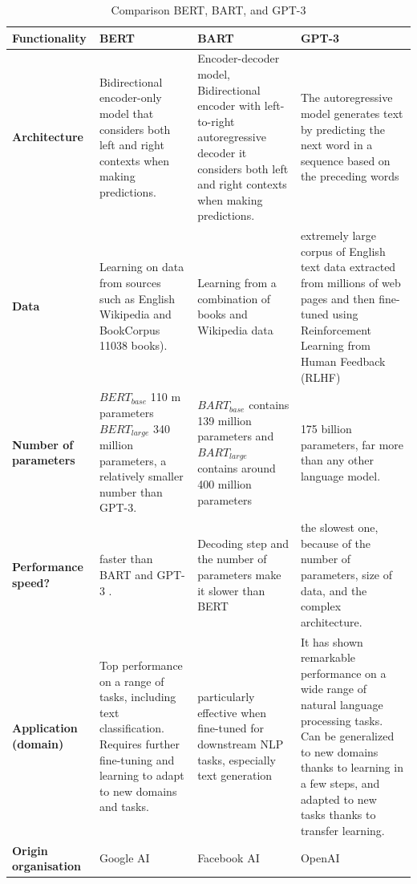 \begin{table}[h]
	\vspace{-1.2cm}
	\caption{Comparison BERT, BART, and GPT-3} 
	\label{table:bertvsbartvsgpt3}
\hspace{-2cm}
\begin{tabular}{ | m{2.5cm}| m{4cm}| m{4.5cm} |m{5.5cm} |  } 

	\hline
	\textbf{Functionality}& \textbf{BERT} & \textbf{BART} &\textbf{GPT-3} \\ 
	\hline\hline
	\textbf{Architecture} & Bidirectional encoder-only model that considers both left and right contexts when making predictions. &  Encoder-decoder model, Bidirectional encoder with left-to-right autoregressive decoder it considers both left and right contexts when making predictions. &The autoregressive model generates text by predicting the next word in a sequence based on the preceding words \\ 
	\hline
		\textbf{Data} & Learning on data from sources such as English Wikipedia and BookCorpus 11038 books). & Learning from a combination of books and Wikipedia data &  extremely large corpus of English text data extracted from millions of web pages and then fine-tuned using Reinforcement Learning from Human Feedback (RLHF) \\ 
	\hline
		\textbf{Number of parameters }& $BERT_{base}$ 110 m parameters  $BERT_{large}$ 340 million parameters, a relatively smaller number than GPT-3. & $BART_{base}$ contains 139 million parameters and $BART_{large}$ contains around 400 million parameters&175 billion parameters, far more than any other language model.\\
		\hline
			\textbf{Performance speed?}& faster than BART and GPT-3
			.& Decoding step and the number of parameters make it slower than BERT& the slowest one, because of the number of parameters, size of data, and the complex architecture.\\
		\hline
			\textbf{Application (domain)}&Top performance on a range of tasks, including text classification.
			Requires further fine-tuning and learning to adapt to new domains and tasks.&particularly effective when fine-tuned for downstream NLP tasks, especially text generation&It has shown remarkable performance on a wide range of natural language processing tasks.
			Can be generalized to new domains thanks to learning in a few steps, and adapted to new tasks thanks to transfer learning.\\
			\hline

\textbf{Origin organisation}&Google AI&Facebook AI& OpenAI\\
\hline		
\end{tabular}
	\end{table}


